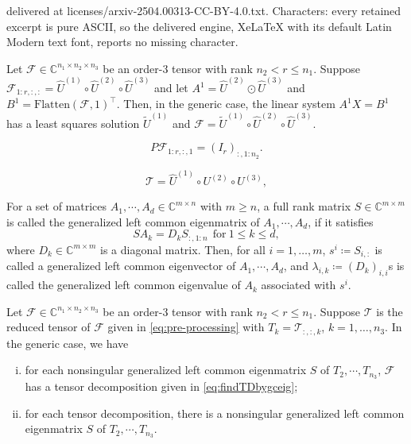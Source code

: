 \documentclass[10pt,a4paper]{amsart}
\renewcommand{\hat}{\widehat}
\renewcommand{\tilde}{\widetilde}
\begin{document}
delivered at licenses/arxiv-2504.00313-CC-BY-4.0.txt. Characters: every retained excerpt is pure ASCII, so the delivered engine, XeLaTeX with its default Latin Modern text font, reports no missing character.
\begin{lemma} \label{lemma:rton1}
Let $\mathcal{F}\in \mathbb{C}^{n_1 \times n_2 \times  n_3}$ be an order-3 tensor with
 rank $n_2 < r \le n_1$. 
 Suppose $\mathcal{F}_{1:r,:,:}=\hat{U}^{(1)} \circ \hat{U}^{(2)} \circ \hat{U}^{(3)}$
 and let  $A^1= \hat{U}^{(2)} \odot \hat{U}^{(3)}$ and $B^1=\mathrm{Flatten}(\mathcal{F},1)^\top$.
Then, in the generic case, the linear system  $A^1X=B^1$ has a least squares solution
 $\tilde{U}^{(1)}$ and  $\mathcal{F}=\tilde{U}^{(1)} \circ \hat{U}^{(2)}  \circ \hat{U}^{(3)}$.
\end{lemma}

\begin{equation}\label{eq:pre-processing}
    P \mathcal{F}_{1:r,:,1}=(I_r)_{:,1:n_2}.
\end{equation}

\begin{equation}\label{T-decomp}
 \mathcal{T} = \hat{U}^{(1)} \circ U^{(2)} \circ U^{(3)}, 
\end{equation}

\begin{definition} \label{def-gen-eigen}
    For a set of matrices $A_1,\cdots,A_d \in \mathbb{C}^{m \times n}$ with $m \geq n$, a full rank matrix $S \in \mathbb{C}^{m \times m}$ is called the generalized left common eigenmatrix of $A_1,\cdots,A_d$, if it satisfies
    \begin{equation} \label{eq:gceig}
            S A_k  = D_k S_{:,1:n} ~~\mathrm{for~}1\leq k \leq d, 
    \end{equation}
    where $D_k \in \mathbb{C}^{m \times m}$ is a diagonal matrix. 
    Then, for all $i =1, \ldots,m$, $s^i \coloneqq S_{i,:}$ is called a generalized left common eigenvector of 
$A_1,\cdots,A_d$, and $\lambda_{i,k} \coloneqq (D_k)_{i,i}$s is called the generalized left common eigenvalue of $A_k$ associated with $s^i$.
\end{definition}

\begin{theorem} \label{thm:SequDecom}
Let $\mathcal{F}\in \mathbb{C}^{n_1 \times n_2 \times  n_3}$ be an order-3 tensor with
 rank $n_2 < r \le n_1$. 
 Suppose $\mathcal{T}$ is the reduced tensor of $\mathcal{F}$ given in \eqref{eq:pre-processing}
 with  ${T}_{k}={\mathcal{T}}_{:,:,k}$, $k=1, \ldots, n_3$.
In the generic case, we have
    \begin{enumerate}[(i)]
        \item for each nonsingular generalized left common eigenmatrix $S$ of $T_2,\cdots,T_{n_3}$,
         $\mathcal{F}$ has a tensor decomposition given in \eqref{eq:findTDbygceig};
        \item  for each tensor decomposition, there is a nonsingular generalized left 
        common eigenmatrix $S$ of $T_2,\cdots,T_{n_3}$.
    \end{enumerate}
\end{theorem}
\end{document}
